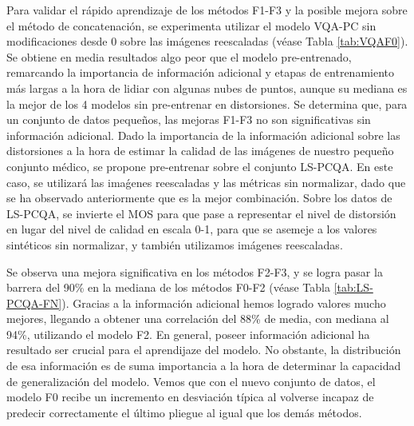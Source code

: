 Para validar el rápido aprendizaje de los métodos F1-F3 y la posible mejora 
sobre el método de concatenación, se experimenta utilizar el modelo VQA-PC sin 
modificaciones desde 0 sobre las imágenes reescaladas (véase Tabla \ref{tab:VQAF0}).
Se obtiene en media resultados algo peor que el modelo 
pre-entrenado, remarcando la importancia de información adicional y etapas 
de entrenamiento más largas a la hora de lidiar con algunas nubes de puntos, aunque su
mediana es la mejor de los 4 modelos sin pre-entrenar en distorsiones. 
Se determina que, para un conjunto de datos pequeños, las mejoras F1-F3 no son significativas sin información adicional. 
Dado la importancia de la información adicional sobre las distorsiones a la 
hora de estimar la calidad de las imágenes de nuestro pequeño conjunto médico, 
se propone pre-entrenar sobre el conjunto LS-PCQA.
En este caso, se utilizará las imaǵenes reescaladas y las métricas sin normalizar, 
dado que se ha observado anteriormente que es la mejor combinación. Sobre los 
datos de LS-PCQA, se invierte el MOS para que pase a representar el nivel 
de distorsión en lugar del nivel de calidad en escala 0-1, para que se asemeje a los 
valores sintéticos sin normalizar, y también utilizamos imágenes reescaladas.

Se observa una mejora significativa en los métodos F2-F3, y se logra 
pasar la barrera del 90\% en la mediana de los métodos F0-F2 (véase Tabla \ref{tab:LS-PCQA-FN}).
Gracias a la información adicional hemos logrado valores mucho mejores, llegando a 
obtener una correlación del 88\% de media, con mediana al 94\%, utilizando el modelo F2. 
En general, poseer información adicional ha resultado ser crucial para el aprendijaze 
del modelo. No obstante, la distribución de esa información es de suma importancia a la 
hora de determinar la capacidad de generalización del modelo. Vemos que con el nuevo 
conjunto de datos, el modelo F0 recibe un incremento en desviación típica al
volverse incapaz de predecir correctamente el último pliegue al igual que los demás métodos.  

